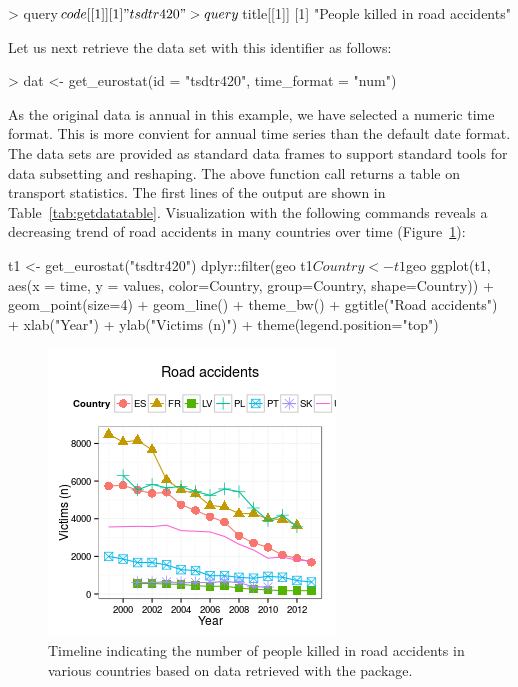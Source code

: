 \begin{example}
> query$code[[1]]
[1] "tsdtr420"

> query$title[[1]]
[1] "People killed in road accidents"
\end{example}


Let us next retrieve the data set with this identifier as follows:

\begin{example}
> dat <- get_eurostat(id = "tsdtr420", time_format = "num")
\end{example}

As the original data is annual in this example, we have selected a
numeric time format. This is more convient for annual time series than
the default date format. The data sets are provided as standard data
frames to support standard tools for data subsetting and
reshaping. The above function call returns a table on transport
statistics.  The first lines of the output are shown in
Table~\ref{tab:getdatatable}. Visualization with the following commands
reveals a decreasing trend of road accidents in many countries over
time (Figure~\ref{fig:transport}):


\begin{example}
t1 <- get_eurostat("tsdtr420") %
  dplyr::filter(geo %
t1$Country <- t1$geo
ggplot(t1, aes(x = time, y = values, color=Country, group=Country, shape=Country)) +
  geom_point(size=4) + 
  geom_line() + theme_bw() + ggtitle("Road accidents") +
  xlab("Year") + ylab("Victims (n)") + theme(legend.position="top")
\end{example}

\begin{figure}
\begin{center}
\includegraphics{2015-manu-roadacc-1}
\end{center}
\caption{Timeline indicating the number of people killed in road accidents in various countries based on data retrieved with the  package.}
\label{fig:transport}
\end{figure}




